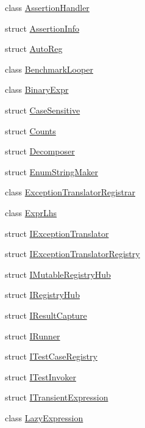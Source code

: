 \begin{DoxyCompactItemize}
\item 
class \mbox{\hyperlink{classCatch_1_1AssertionHandler}{Assertion\+Handler}}
\item 
struct \mbox{\hyperlink{structCatch_1_1AssertionInfo}{Assertion\+Info}}
\item 
struct \mbox{\hyperlink{structCatch_1_1AutoReg}{Auto\+Reg}}
\item 
class \mbox{\hyperlink{classCatch_1_1BenchmarkLooper}{Benchmark\+Looper}}
\item 
class \mbox{\hyperlink{classCatch_1_1BinaryExpr}{Binary\+Expr}}
\item 
struct \mbox{\hyperlink{structCatch_1_1CaseSensitive}{Case\+Sensitive}}
\item 
struct \mbox{\hyperlink{structCatch_1_1Counts}{Counts}}
\item 
struct \mbox{\hyperlink{structCatch_1_1Decomposer}{Decomposer}}
\item 
struct \mbox{\hyperlink{structCatch_1_1EnumStringMaker}{Enum\+String\+Maker}}
\item 
class \mbox{\hyperlink{classCatch_1_1ExceptionTranslatorRegistrar}{Exception\+Translator\+Registrar}}
\item 
class \mbox{\hyperlink{classCatch_1_1ExprLhs}{Expr\+Lhs}}
\item 
struct \mbox{\hyperlink{structCatch_1_1IExceptionTranslator}{I\+Exception\+Translator}}
\item 
struct \mbox{\hyperlink{structCatch_1_1IExceptionTranslatorRegistry}{I\+Exception\+Translator\+Registry}}
\item 
struct \mbox{\hyperlink{structCatch_1_1IMutableRegistryHub}{I\+Mutable\+Registry\+Hub}}
\item 
struct \mbox{\hyperlink{structCatch_1_1IRegistryHub}{I\+Registry\+Hub}}
\item 
struct \mbox{\hyperlink{structCatch_1_1IResultCapture}{I\+Result\+Capture}}
\item 
struct \mbox{\hyperlink{structCatch_1_1IRunner}{I\+Runner}}
\item 
struct \mbox{\hyperlink{structCatch_1_1ITestCaseRegistry}{I\+Test\+Case\+Registry}}
\item 
struct \mbox{\hyperlink{structCatch_1_1ITestInvoker}{I\+Test\+Invoker}}
\item 
struct \mbox{\hyperlink{structCatch_1_1ITransientExpression}{I\+Transient\+Expression}}
\item 
class \mbox{\hyperlink{classCatch_1_1LazyExpression}{Lazy\+Expression}}

\end{DoxyCompactItemize}
